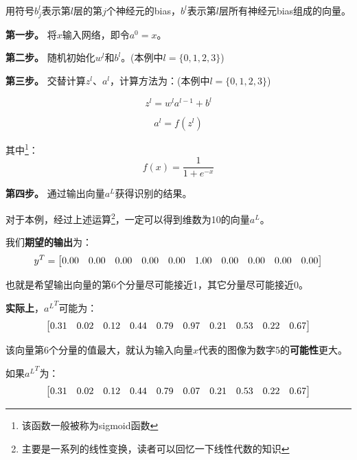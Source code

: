 \documentclass[titlepage,UTF8,zihao=-4]{ctexart}
\begin{document}
用符号$b^l_j$表示第$l$层的第$j$个神经元的bias，$b^l$表示第$l$层所有神经元bias组成的向量。

\textbf{第一步。} 将$x$输入网络，即令$a^0=x$。

\textbf{第二步。} 随机初始化$w^l$和$b^l$。(本例中$l=\{0,1,2,3\}$)

\textbf{第三步。} 交替计算$z^l$、$a^l$，计算方法为：(本例中$l=\{0,1,2,3\}$)

\begin{equation*}
    z^l = w^la^{l-1}+b^l 
\end{equation*}

\begin{equation*}
    a^l = f(z^l) 
\end{equation*}

其中\footnote{该函数一般被称为sigmoid函数}：
\begin{equation*}
f(x) = \frac{1}{1+e^{-x}}
\end{equation*}

\textbf{第四步。} 通过输出向量$a^L$获得识别的结果。

对于本例，经过上述运算\footnote{主要是一系列的线性变换，读者可以回忆一下线性代数的知识}，一定可以得到维数为10的向量$a^L$。

我们\textbf{期望的输出}为：
\begin{equation*}
y^T=
\begin{bmatrix}
\addtocounter{MaxMatrixCols}{28}
0.00 &
0.00 &
0.00 &
0.00 &
0.00 &
1.00 &
0.00 &
0.00 &   
0.00 &
0.00 
\end{bmatrix}
\end{equation*}

也就是希望输出向量的第6个分量尽可能接近1，其它分量尽可能接近0。

\textbf{实际上}，${a^{L}}^T$可能为：
\begin{equation*}
    \begin{bmatrix}
    \addtocounter{MaxMatrixCols}{28}
    0.31 &
    0.02 &
    0.12 &
    0.44 &
    0.79 &
    0.97 &
    0.21 &
    0.53 &   
     0.22 &
    0.67 
    \end{bmatrix}
\end{equation*}

该向量第6个分量的值最大，就认为输入向量$x$代表的图像为数字5的\textbf{可能性}更大。

如果${a^{L}}^T$为：
\begin{equation*}
\begin{bmatrix}
\addtocounter{MaxMatrixCols}{28}
0.31 &
0.02 &
0.12 &
0.44 &
0.79 &
0.07 &
0.21 &
0.53 &   
0.22 &
0.67 
\end{bmatrix}
\end{equation*}
\end{document}
